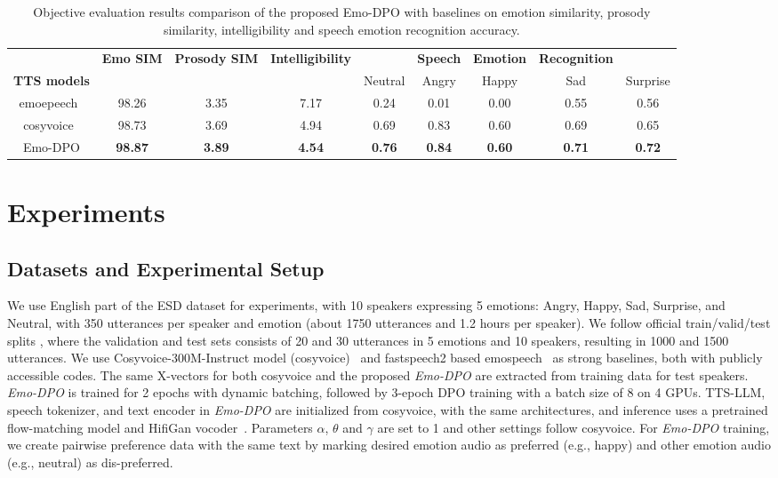 \begin{table}
\vspace{-0.3cm}
\centering
\caption{Objective evaluation results comparison of the proposed Emo-DPO with baselines on emotion similarity, prosody similarity, intelligibility and speech emotion recognition accuracy.}
\begin{tabular}{cccc|ccccc}
\toprule
 & \textbf{Emo SIM} & \textbf{Prosody SIM} & \textbf{Intelligibility} &  & \textbf{Speech} & \textbf{Emotion} & \textbf{Recognition} &  \\
\textbf{TTS models} &  &  &  & Neutral & Angry & Happy & Sad & Surprise \\\midrule
emoepeech~\cite{diatlova2023emospeech} & 98.26 & 3.35 & 7.17 & 0.24 & 0.01 & 0.00 & 0.55 & 0.56 \\
cosyvoice~\cite{du2024cosyvoice} & 98.73 & 3.69 & 4.94 & 0.69 & 0.83 & 0.60 & 0.69 & 0.65 \\
Emo-DPO & \textbf{98.87} & \textbf{3.89} & \textbf{4.54} & \textbf{0.76} & \textbf{0.84} & \textbf{0.60} & \textbf{0.71} & \textbf{0.72} \\
\bottomrule
\end{tabular}
\label{objective}
\vspace{-0.2cm}
\end{table}

\section{Experiments}

\subsection{Datasets and Experimental Setup}
We use English part of the ESD dataset \cite{zhou2022emotional} for experiments, with 10 speakers expressing 5 emotions: Angry, Happy, Sad, Surprise, and Neutral, with 350 utterances per speaker and emotion (about 1750 utterances and 1.2 hours per speaker). We follow official train/valid/test splits \cite{zhou2022emotional,diatlova2023emospeech}, where the validation and test sets consists of 20 and 30 utterances in 5 emotions and 10 speakers, resulting in 1000 and 1500 utterances.
We use Cosyvoice-300M-Instruct model (cosyvoice)~\cite{du2024cosyvoice} and fastspeech2 based emospeech~\cite{diatlova2023emospeech} as strong baselines,  both with publicly accessible codes. The same X-vectors for both cosyvoice and the proposed \textit{Emo-DPO} are extracted from training data for test speakers. \textit{Emo-DPO} is trained for 2 epochs with dynamic batching, followed by 3-epoch DPO training with a batch size of 8 on 4 GPUs.  
TTS-LLM, speech tokenizer, and text encoder in \textit{Emo-DPO} are initialized from cosyvoice, with the same architectures, and inference uses a pretrained flow-matching model and HifiGan vocoder~\cite{du2024cosyvoice}. Parameters $\alpha$, $\theta$ and $\gamma$ are set to 1 and other settings follow cosyvoice. For \textit{Emo-DPO} training, we create pairwise preference data with the same text by marking desired emotion audio as preferred (e.g., happy) and other emotion audio (e.g., neutral) as dis-preferred. 
\vspace{-0.3cm}
